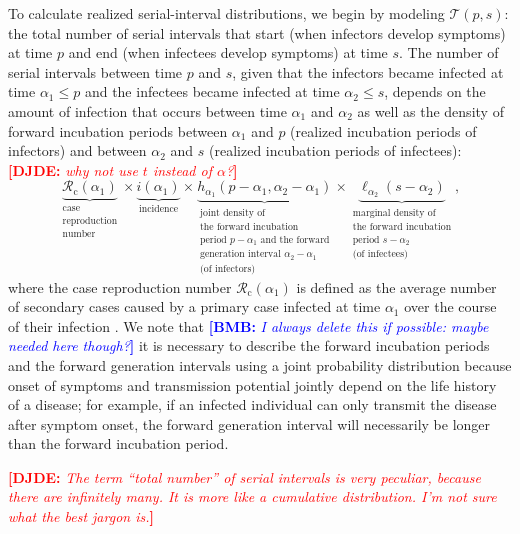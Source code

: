 \documentclass[12pt]{article}
\newcommand{\comment}{\showcomment}
\newcommand{\showcomment}[3]{\textcolor{#1}{\textbf{[#2: }\textsl{#3}\textbf{]}}}
\newcommand{\bmb}[1]{\comment{blue}{BMB}{#1}}
\newcommand{\djde}[1]{\comment{red}{DJDE}{#1}}
\newcommand{\Rx}[1]{\ensuremath{{\mathcal R}_{#1}}\xspace}
\newcommand{\Rc}{\Rx{\mathrm{c}}}
\newcommand{\psymp}{\ensuremath{p}} %
\newcommand{\ssymp}{\ensuremath{s}} %
\newcommand{\pinf}{\ensuremath{\alpha_1}} %
\newcommand{\sinf}{\ensuremath{\alpha_2}} %
\newcommand{\idist}{\ell} %
\newcommand{\total}{{\mathcal T}} %
\begin{document}
To calculate realized serial-interval distributions, we begin by modeling $\total(\psymp,\ssymp)$: the total number of serial intervals that start (when infectors develop symptoms) at time $\psymp$ and end (when infectees develop symptoms) at time $\ssymp$.
The number of serial intervals between time $\psymp$ and $\ssymp$,
given that the infectors became infected at time $\pinf\le\psymp$ and
the infectees became infected at time $\sinf\le\ssymp$, depends on the
amount of infection that occurs between time $\pinf$ and $\sinf$ as
well as the density of forward incubation periods between $\pinf$ and
$\psymp$ (realized incubation periods of infectors) and between
$\sinf$ and $\ssymp$ (realized incubation periods of infectees):
\djde{why not use $t$ instead of $\alpha$?}
\begin{equation}
\underbrace{\Rc (\pinf)}_{\substack{\text{case} \\ \text{reproduction} \\ \text{number}}} 
\times 
\underbrace{i(\pinf)}_{\text{incidence}} 
\times 
\underbrace{h_{\pinf}(\psymp-\pinf, \sinf - \pinf)}_{\substack{\text{joint density of} \\ \text{the forward incubation} \\ \text{period } p-\pinf \text{ and the forward} \\ \text{generation interval } \sinf-\pinf\\ \text{(of infectors)}}}
\times
\underbrace{\idist_{\sinf}(\ssymp - \sinf)}_{\substack{\text{marginal density of} \\ \text{the forward incubation} \\ \text{period } \ssymp-\sinf \\ \text{(of infectees)}}},
\end{equation}
where the case reproduction number $\Rc (\pinf)$ is defined as the average number of secondary cases caused by a primary case infected at time $\pinf$ over the course of their infection \citep{fraser2007estimating}.
We note that \bmb{I always delete this if possible: maybe needed here though?} it is necessary to describe the forward incubation periods and the forward generation intervals using a joint probability distribution because onset of symptoms and transmission potential jointly depend on the life history of a disease;
for example, if an infected individual can only transmit the disease after symptom onset, the forward generation interval will necessarily be longer than the forward incubation period.

\djde{The term ``total number'' of serial intervals is very peculiar,
  because there are infinitely many.  It is more like a cumulative
  distribution.  I'm not sure what the best jargon is.}
\end{document}
